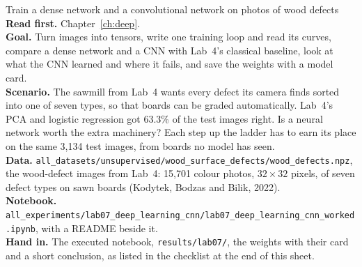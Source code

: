 
\begin{labproject}{Train a dense network and a convolutional network on photos of wood defects}
\textbf{Read first.} Chapter~\ref{ch:deep}.\\
\textbf{Goal.} Turn images into tensors, write one training loop and read its curves, compare a dense network and a CNN with Lab~4's classical baseline, look at what the CNN learned and where it fails, and save the weights with a model card.\\
\textbf{Scenario.} The sawmill from Lab~4 wants every defect its camera finds sorted into one of seven types, so that boards can be graded automatically. Lab~4's PCA and logistic regression got 63.3\% of the test images right. Is a neural network worth the extra machinery? Each step up the ladder has to earn its place on the same 3,134 test images, from boards no model has seen.\\
\textbf{Data.} \texttt{all\_datasets/\allowbreak unsupervised/\allowbreak wood\_surface\_defects/\allowbreak wood\_defects.npz}, the wood-defect images from Lab~4: 15,701 colour photos, $32\times32$ pixels, of seven defect types on sawn boards (Kodytek, Bodzas and Bilik, 2022).\\
\textbf{Notebook.} \texttt{all\_experiments/\allowbreak lab07\_deep\_learning\_cnn/\allowbreak lab07\_deep\_learning\_cnn\_worked.ipynb}, with a README beside it.\\
\textbf{Hand in.} The executed notebook, \texttt{results/lab07/}, the weights with their card and a short conclusion, as listed in the checklist at the end of this sheet.
\end{labproject}


